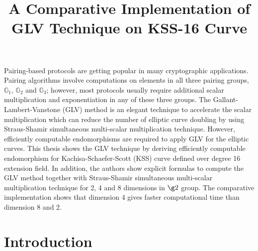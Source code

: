 
\title{A Comparative Implementation of GLV Technique on KSS-16 Curve}

Pairing-based protocols are getting popular in many cryptographic applications. 
Pairing algorithms involve computations on elements in all three pairing groups, $\mathbb{G}_1$, $\mathbb{G}_2$ and $\mathbb{G}_3$; however, most protocols usually require additional scalar multiplication and exponentiation in any of these three groups. 
The Gallant-Lambert-Vanstone (GLV) method is an elegant technique to accelerate the scalar multiplication which can reduce the number of elliptic curve doubling by using Straus-Shamir simultaneous multi-scalar multiplication technique.
However, efficiently computable endomorphisms are required to apply GLV for the elliptic curves. 
This thesis shows the GLV technique by deriving efficiently computable endomorphism for Kachisa-Schaefer-Scott (KSS) curve defined over degree 16 extension field.
In addition, the authors show explicit formulas to compute the GLV method together with Straus-Shamir simultaneous multi-scalar multiplication technique for 2, 4 and 8 dimensions in $\g2$ group. 
The comparative implementation shows that dimension 4 gives faster computational time than dimension 8 and 2. 

\section{Introduction}

